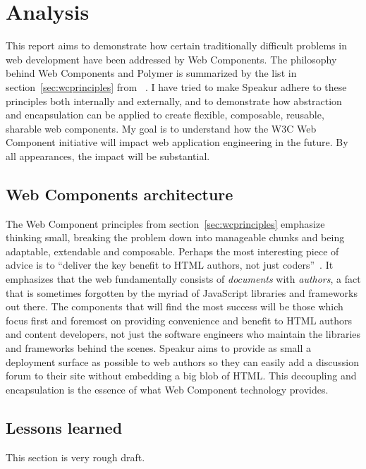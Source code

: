 \chapter{Analysis}
%

This report aims to demonstrate how certain traditionally difficult problems in web development have been addressed by Web Components.
The philosophy behind Web Components and Polymer is summarized by the list in section~\ref{sec:wcprinciples} from ~\cite{webcomponentscontributors2014}.
I have tried to make Speakur adhere to these principles both internally and externally,
and to demonstrate how abstraction and encapsulation can be applied to create flexible, composable, reusable, sharable web components.
My goal is to understand how the W3C Web Component initiative will impact web application engineering in the future.
By all appearances, the impact will be substantial.

\section{Web Components architecture}
The Web Component principles from section~\ref{sec:wcprinciples} emphasize thinking small, 
breaking the problem down into manageable chunks and being adaptable, extendable and composable.
Perhaps the most interesting piece of advice is to ``deliver the key benefit to HTML authors, not just coders''~\cite{webcomponentscontributors2014}.
It emphasizes that the web fundamentally consists of \textit{documents} with \textit{authors}, 
a fact that is sometimes forgotten by the myriad of JavaScript libraries and frameworks out there.
The components that will find the most success will be those which focus first and foremost on providing convenience and benefit to HTML authors and content developers, 
not just the software engineers who maintain the libraries and frameworks behind the scenes.
Speakur aims to provide as small a deployment surface as possible to web authors so they can easily add a discussion forum to their site without embedding a big blob of HTML.
This decoupling and encapsulation is the essence of what Web Component technology provides.

\section{Lessons learned}
This section is very rough draft.

